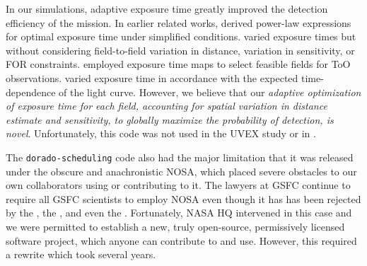 \documentclass[twocolumn,times]{aastex631}
\begin{document}
In our simulations, adaptive exposure time greatly improved the detection efficiency of the mission. In earlier related works, \citet{2016ExA....42..165C} derived power-law expressions for optimal exposure time under simplified conditions. \citet{2017ApJ...834...84C} varied exposure times but without considering field-to-field variation in distance, variation in sensitivity, or \ac{FOR} constraints. \citet{2020A&C....3300425H} employed exposure time maps to select feasible fields for \ac{ToO} observations. \citet{2021RAA....21..308L} varied exposure time in accordance with the expected time-dependence of the light curve. However, we believe that our \textit{adaptive optimization of exposure time for each field, accounting for spatial variation in distance estimate and sensitivity, to globally maximize the probability of detection, is novel}. Unfortunately, this code was not used in the \ac{UVEX} study or in \citet{2025arXiv250114109C}.

The \texttt{dorado-scheduling} code also had the major limitation that it was released under the obscure and anachronistic \ac{NOSA}, which placed severe obstacles to our own collaborators using or contributing to it. The lawyers at \ac{GSFC} continue to require all \ac{GSFC} scientists to employ \ac{NOSA} even though it has has been rejected by the \citet{FSF}, the \citet{NAP25217}, and even the \citet{SMD}. Fortunately, NASA \ac{HQ} intervened in this case and we were permitted to establish a new, truly open-source, permissively licensed software project, which anyone can contribute to and use. However, this required a rewrite which took several years.
\end{document}
